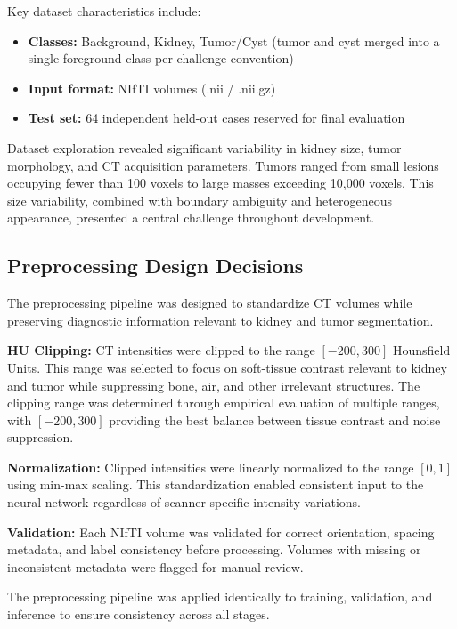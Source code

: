 Key dataset characteristics include:
\begin{itemize}
    \item \textbf{Classes:} Background, Kidney, Tumor/Cyst (tumor and cyst merged into a single foreground class per challenge convention)
    \item \textbf{Input format:} NIfTI volumes (.nii / .nii.gz)
    \item \textbf{Test set:} 64 independent held-out cases reserved for final evaluation
\end{itemize}

Dataset exploration revealed significant variability in kidney size, tumor morphology, and CT acquisition parameters. Tumors ranged from small lesions occupying fewer than 100 voxels to large masses exceeding 10,000 voxels. This size variability, combined with boundary ambiguity and heterogeneous appearance, presented a central challenge throughout development.

\subsection{Preprocessing Design Decisions}

The preprocessing pipeline was designed to standardize CT volumes while preserving diagnostic information relevant to kidney and tumor segmentation.

\textbf{HU Clipping:} CT intensities were clipped to the range $[-200, 300]$ Hounsfield Units. This range was selected to focus on soft-tissue contrast relevant to kidney and tumor while suppressing bone, air, and other irrelevant structures. The clipping range was determined through empirical evaluation of multiple ranges, with $[-200, 300]$ providing the best balance between tissue contrast and noise suppression.

\textbf{Normalization:} Clipped intensities were linearly normalized to the range $[0, 1]$ using min-max scaling. This standardization enabled consistent input to the neural network regardless of scanner-specific intensity variations.

\textbf{Validation:} Each NIfTI volume was validated for correct orientation, spacing metadata, and label consistency before processing. Volumes with missing or inconsistent metadata were flagged for manual review.

The preprocessing pipeline was applied identically to training, validation, and inference to ensure consistency across all stages.


